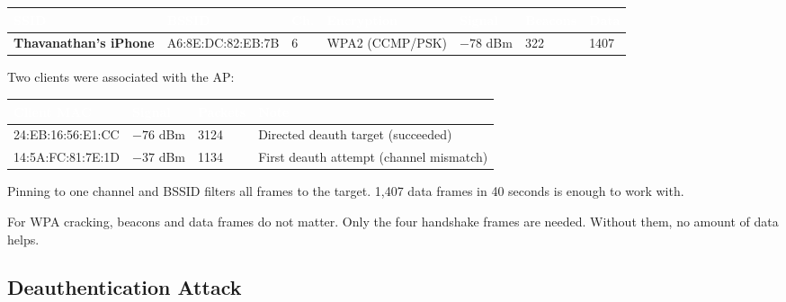 \documentclass[12pt,a4paper]{article}
\begin{document}
\vspace{4pt}
\begin{tabularx}{\textwidth}{>{\bfseries\footnotesize}X >{\footnotesize}l >{\centering\arraybackslash\footnotesize}p{0.6cm} >{\footnotesize}l >{\centering\arraybackslash\footnotesize}p{1.5cm} >{\centering\arraybackslash\footnotesize}p{1.4cm} >{\centering\arraybackslash\footnotesize}p{1.2cm}}
\arrayrulecolor{accent!40}
\toprule
\rowcolor{tableheadbg}
\textcolor{white}{\textbf{SSID}} &
\textcolor{white}{\textbf{BSSID}} &
\textcolor{white}{\textbf{Ch.}} &
\textcolor{white}{\textbf{Encryption}} &
\textcolor{white}{\textbf{Signal}} &
\textcolor{white}{\textbf{Beacons}} &
\textcolor{white}{\textbf{Data}} \\
\midrule
Thavanathan's iPhone & A6:8E:DC:82:EB:7B & 6 & WPA2 (CCMP/PSK) & $-78$ dBm & 322 & 1407 \\
\bottomrule
\end{tabularx}
\vspace{4pt}

Two clients were associated with the AP:

\vspace{4pt}
\begin{tabularx}{\textwidth}{>{\footnotesize}l >{\centering\arraybackslash\footnotesize}p{1.5cm} >{\centering\arraybackslash\footnotesize}p{1.4cm} >{\footnotesize}X}
\arrayrulecolor{accent!40}
\toprule
\rowcolor{tableheadbg}
\textcolor{white}{\textbf{Client MAC}} &
\textcolor{white}{\textbf{Signal}} &
\textcolor{white}{\textbf{Packets}} &
\textcolor{white}{\textbf{Note}} \\
\midrule
24:EB:16:56:E1:CC & $-76$ dBm & 3124 & Directed deauth target (succeeded) \\
\rowcolor{tablerowalt}
14:5A:FC:81:7E:1D & $-37$ dBm & 1134 & First deauth attempt (channel mismatch) \\
\bottomrule
\end{tabularx}
\vspace{4pt}

Pinning to one channel and BSSID filters all frames to the target. 1,407 data frames in 40 seconds is enough to work with.

For WPA cracking, beacons and data frames do not matter. Only the four handshake frames are needed. Without them, no amount of data helps.

\subsection{Deauthentication Attack}
\label{sec:deauth}
\end{document}
